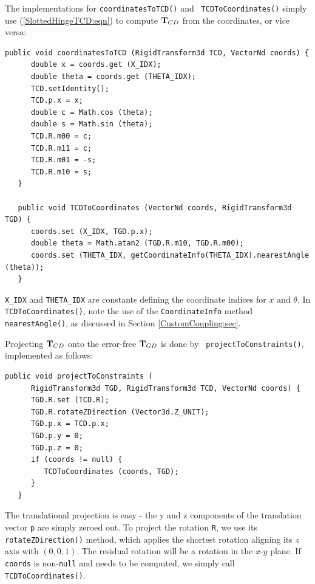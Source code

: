 The implementations for {\tt coordinatesToTCD()} and {\tt
TCDToCoordinates()} simply use (\ref{SlottedHingeTCD:eqn}) to
compute ${\bf T}_{CD}$ from the coordinates, or vice versa:
%
\begin{lstlisting}[]
   public void coordinatesToTCD (RigidTransform3d TCD, VectorNd coords) {
      double x = coords.get (X_IDX);
      double theta = coords.get (THETA_IDX);
      TCD.setIdentity();
      TCD.p.x = x;
      double c = Math.cos (theta);
      double s = Math.sin (theta);
      TCD.R.m00 = c;
      TCD.R.m11 = c;
      TCD.R.m01 = -s;
      TCD.R.m10 = s;
   }
   
   public void TCDToCoordinates (VectorNd coords, RigidTransform3d TGD) {
      coords.set (X_IDX, TGD.p.x);
      double theta = Math.atan2 (TGD.R.m10, TGD.R.m00);
      coords.set (THETA_IDX, getCoordinateInfo(THETA_IDX).nearestAngle (theta));
   }
\end{lstlisting}
%
{\tt X\_IDX} and {\tt THETA\_IDX} are constants defining the
coordinate indices for $x$ and $\theta$. In {\tt TCDToCoordinates()},
note the use of the {\tt CoordinateInfo} method {\tt
nearestAngle()}, as discussed in Section
\ref{CustomCoupling:sec}.

Projecting ${\bf T}_{CD}$ onto the error-free ${\bf T}_{GD}$ is done by {\tt
projectToConstraints()}, implemented as follows:
%
\begin{lstlisting}[]
   public void projectToConstraints (
      RigidTransform3d TGD, RigidTransform3d TCD, VectorNd coords) {
      TGD.R.set (TCD.R);
      TGD.R.rotateZDirection (Vector3d.Z_UNIT);
      TGD.p.x = TCD.p.x;
      TGD.p.y = 0;
      TGD.p.z = 0;
      if (coords != null) {
         TCDToCoordinates (coords, TGD);
      }
   }
\end{lstlisting}
%
The translational projection is easy - the y and z components of the
translation vector {\tt p} are simply zeroed out. To project the
rotation {\tt R}, we use its {\tt rotateZDirection()} method, which
applies the shortest rotation aligning its $z$ axis with $(0, 0,
1)$. The residual rotation will be a rotation in the $x$-$y$ plane.
If {\tt coords} is non-{\tt null} and needs to be computed, we simply
call {\tt TCDToCoordinates()}.

